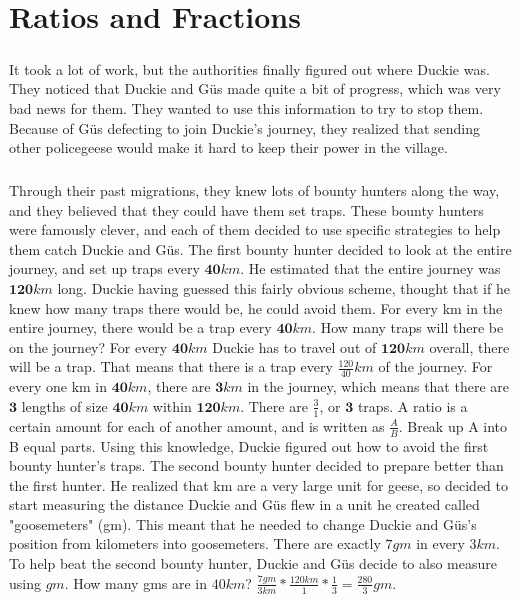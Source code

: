 \chapter{Ratios and Fractions}
\paragraph{} It took a lot of work, but the authorities finally figured out where Duckie was. They noticed that Duckie and Güs made quite a bit of progress, which was very bad news for them. They wanted to use this information to try to stop them. Because of Güs defecting to join Duckie's journey, they realized that sending other policegeese would make it hard to keep their power in the village. 
\paragraph{} Through their past migrations, they knew lots of bounty hunters along the way, and they believed that they could have them set traps. These bounty hunters were famously clever, and each of them decided to use specific strategies to help them catch Duckie and Güs.
\vfill
\pagebreak
{The first bounty hunter decided to look at the entire journey, and set up traps every $\textbf{40} km$. He estimated that the entire journey was $\textbf{120} km$ long. Duckie having guessed this fairly obvious scheme,  thought that if he knew how many traps there would be, he could avoid them. For every km in the entire journey, there would be a trap every $\textbf{40} km$. How many traps will there be on the journey?}
{For every $\textbf{40} km$ Duckie has to travel out of $\textbf{120} km$ overall, there will be a trap. That means that there is a trap every $\frac{120}{40} km$ of the journey. For every one km in $\textbf{40} km$, there are $\textbf{3} km$ in the journey, which means that there are $\textbf{3}$ lengths of size $\textbf{40} km$ within $\textbf{120} km$. There are $\frac{3}{1}$, or $\textbf{3}$ traps.}
{A ratio is a certain amount for each of another amount, and is written as $\frac{A}{B}$. Break up A into B equal parts.}
{}
{Using this knowledge, Duckie figured out how to avoid the first bounty hunter's traps. The second bounty hunter decided to prepare better than the first hunter. He realized that km are a very large unit for geese, so decided to start measuring the distance Duckie and Güs flew in a unit he created called "goosemeters" (gm). This meant that he needed to change Duckie and Güs's position from kilometers into goosemeters. There are exactly $7 gm$ in every $3 km$. To help beat the second bounty hunter, Duckie and Güs decide to also measure using $gm$. How many gms are in $40 km$?}{
$\frac{7 gm}{3 km}*\frac{120 km}{1}*\frac{1}{3}=\frac{280}{3} gm$.}
